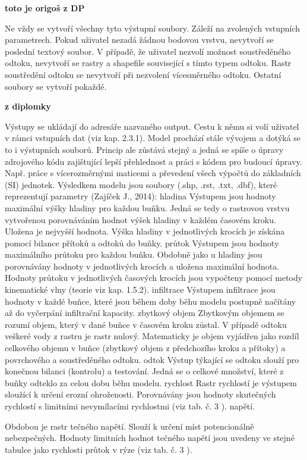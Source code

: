 \textbf{toto je origoš z DP}

\par Ne vždy se vytvoří všechny tyto výstupní soubory. Záleží na zvolených vstupních parametrech. Pokud uživatel nezadá žádnou bodovou vrstvu, nevytvoří se poslední textový soubor. 
V případě, že uživatel nezvolí možnost soustředěného odtoku, nevytvoří se rastry a shapefile související s tímto typem odtoku. Rastr soustředění odtoku se nevytvoří při nezvolení vícesměrného odtoku. 
Ostatní soubory se vytvoří pokaždé.  

\textbf{ z diplomky}

Výstupy se ukládají do adresáře nazvaného output. Cestu k němu si volí uživatel v rámci vstupních dat (viz kap. 2.3.1). Model prochází stále vývojem a dotýká se to i výstupních souborů. Princip ale zůstává stejný a jedná se spíše o úpravy zdrojového kódu zajištující lepší přehlednost a práci s kódem pro budoucí úpravy. Např. práce s vícerozměrnými maticemi a převedení všech výpočtů do základních (SI) jednotek. 
Výsledkem modelu jsou soubory (.shp, .rst, .txt, .dbf), které reprezentují parametry (Zajíček J., 2014):
hladina
Výstupem jsou hodnoty maximální výšky hladiny pro každou buňku. Jedná se tedy o rastrovou vrstvu vytvořenou porovnáváním hodnot výšek hladiny v každém časovém kroku. Uložena je nejvyšší hodnota. Výška hladiny v jednotlivých krocích je získána pomocí bilance přítoků a odtoků do buňky.  
průtok
Výstupem jsou hodnoty maximálního průtoku pro každou buňku. Obdobně jako u hladiny jsou porovnávány hodnoty v jednotlivých krocích a uložena maximální hodnota. Hodnoty průtoku v jednotlivých časových krocích jsou vypočteny pomocí metody kinematické vlny (teorie viz kap. 1.5.2).
infiltrace
Výstupem infiltrace jsou hodnoty v každé buňce, které jsou během doby běhu modelu postupně načítány až do vyčerpání infiltrační kapacity.
zbytkový objem
Zbytkovým objemem se rozumí objem, který v dané buňce v časovém kroku zůstal. V případě odtoku veškeré vody z rastru je rastr nulový. Matematicky je objem vyjádřen jako rozdíl celkového objemu v buňce (zbytkový objem z předchozího kroku a přítoky) a povrchového a soustředěného odtoku.
odtok
Výstup týkající se odtoku slouží pro konečnou bilanci (kontrolu) a testování. Jedná se o celkové množství, které z buňky odteklo za celou dobu běhu modelu. 
rychlost
Rastr rychlostí je výstupem sloužící k určení erozní ohroženosti. Porovnávány jsou hodnoty skutečných rychlostí s limitními nevymílacími rychlostmi (viz tab. č. 3 ).
napětí. 

Obdobou je rastr tečného napětí. Slouží k určení míst potencionálně nebezpečných. Hodnoty limitních hodnot tečného napětí jsou uvedeny ve stejné tabulce jako rychlosti průtok v rýze (viz tab. č. 3 ).

